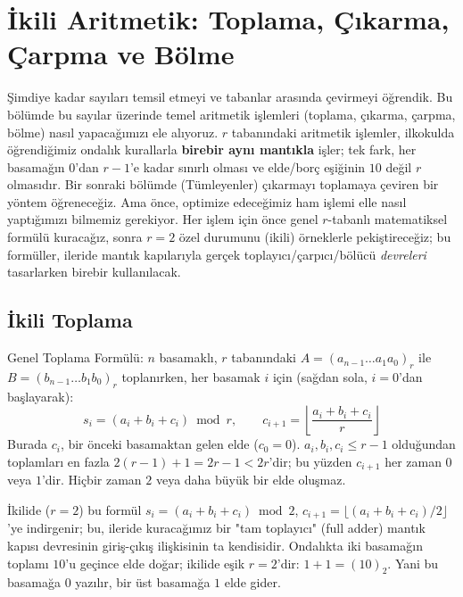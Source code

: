 \section{İkili Aritmetik: Toplama, Çıkarma, Çarpma ve Bölme}
\label{sec:ikili-aritmetik}

Şimdiye kadar sayıları temsil etmeyi ve tabanlar arasında çevirmeyi öğrendik. Bu bölümde bu
sayılar üzerinde temel aritmetik işlemleri (toplama, çıkarma, çarpma, bölme) nasıl
yapacağımızı ele alıyoruz. $r$ tabanındaki aritmetik işlemler, ilkokulda öğrendiğimiz ondalık
kurallarla \textbf{birebir aynı mantıkla} işler; tek fark, her basamağın $0$'dan $r{-}1$'e kadar
sınırlı olması ve elde/borç eşiğinin $10$ değil $r$ olmasıdır. Bir sonraki bölümde (Tümleyenler)
çıkarmayı toplamaya çeviren bir yöntem öğreneceğiz. Ama önce, optimize edeceğimiz ham
işlemi elle nasıl yaptığımızı bilmemiz gerekiyor. Her işlem için önce genel $r$-tabanlı
matematiksel formülü kuracağız, sonra $r=2$ özel durumunu (ikili) örneklerle pekiştireceğiz;
bu formüller, ileride mantık kapılarıyla gerçek toplayıcı/çarpıcı/bölücü \emph{devreleri}
tasarlarken birebir kullanılacak.

\subsection{İkili Toplama}
\label{sec:ikili-toplama}

\begin{tanim}{Genel Toplama Formülü:}
$n$ basamaklı, $r$ tabanındaki $A=(a_{n-1}\ldots a_1a_0)_r$ ile $B=(b_{n-1}\ldots b_1b_0)_r$
toplanırken, her basamak $i$ için (sağdan sola, $i{=}0$'dan başlayarak):
\[
s_i = (a_i+b_i+c_i) \bmod r, \qquad c_{i+1} = \left\lfloor \frac{a_i+b_i+c_i}{r} \right\rfloor
\]
Burada $c_i$, bir önceki basamaktan gelen elde ($c_0{=}0$). $a_i,b_i,c_i \le r-1$ olduğundan
toplamları en fazla $2(r{-}1)+1=2r{-}1<2r$'dir; bu yüzden $c_{i+1}$ her zaman $0$ veya $1$'dir.
Hiçbir zaman $2$ veya daha büyük bir elde oluşmaz.
\end{tanim}

İkilide ($r{=}2$) bu formül $s_i=(a_i+b_i+c_i)\bmod2$, $c_{i+1}=\lfloor(a_i+b_i+c_i)/2\rfloor$'ye
indirgenir; bu, ileride kuracağımız bir "tam toplayıcı" (full adder) mantık kapısı
devresinin giriş-çıkış ilişkisinin ta kendisidir. Ondalıkta iki basamağın toplamı $10$'u geçince
elde doğar; ikilide eşik $r{=}2$'dir: $1+1=(10)_2$. Yani bu basamağa $0$ yazılır, bir üst
basamağa $1$ elde gider.

